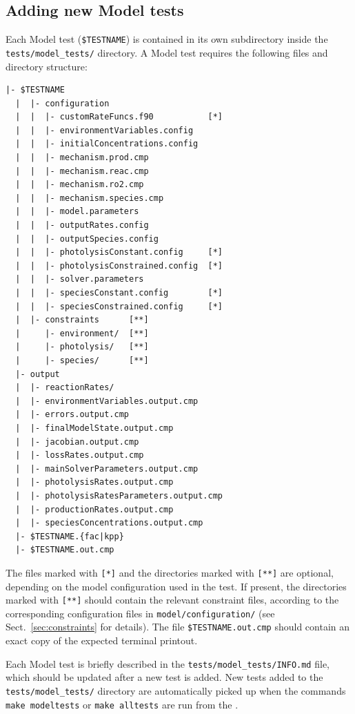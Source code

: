 \subsection{Adding new Model tests} \label{subsec:adding-new-model-tests}

Each Model test (\texttt{\$TESTNAME}) is contained in its own
subdirectory inside the \texttt{tests/model\_tests/} directory. A
Model test requires the following files and directory structure:

\begin{Verbatim}[fontsize=\small]
  |- $TESTNAME
  |  |- configuration
  |  |  |- customRateFuncs.f90           [*]
  |  |  |- environmentVariables.config
  |  |  |- initialConcentrations.config
  |  |  |- mechanism.prod.cmp
  |  |  |- mechanism.reac.cmp
  |  |  |- mechanism.ro2.cmp
  |  |  |- mechanism.species.cmp
  |  |  |- model.parameters
  |  |  |- outputRates.config
  |  |  |- outputSpecies.config
  |  |  |- photolysisConstant.config     [*]
  |  |  |- photolysisConstrained.config  [*]
  |  |  |- solver.parameters
  |  |  |- speciesConstant.config        [*]
  |  |  |- speciesConstrained.config     [*]
  |  |- constraints      [**]
  |     |- environment/  [**]
  |     |- photolysis/   [**]
  |     |- species/      [**]
  |- output
  |  |- reactionRates/
  |  |- environmentVariables.output.cmp
  |  |- errors.output.cmp
  |  |- finalModelState.output.cmp
  |  |- jacobian.output.cmp
  |  |- lossRates.output.cmp
  |  |- mainSolverParameters.output.cmp
  |  |- photolysisRates.output.cmp
  |  |- photolysisRatesParameters.output.cmp
  |  |- productionRates.output.cmp
  |  |- speciesConcentrations.output.cmp
  |- $TESTNAME.{fac|kpp}
  |- $TESTNAME.out.cmp
\end{Verbatim}

The files marked with \texttt{[*]} and the directories marked with
\texttt{[**]} are optional, depending on the model configuration used
in the test. If present, the directories marked with \texttt{[**]}
should contain the relevant constraint files, according to the
corresponding configuration files in \texttt{model/configuration/}
(see Sect.~\ref{sec:constraints} for details). The file
\texttt{\$TESTNAME.out.cmp} should contain an exact copy of the
expected terminal printout.

Each Model test is briefly described in the \texttt{tests/model\_tests/INFO.md}
file, which should be updated after a new test is added. New tests added
to the \texttt{tests/model\_tests/} directory are automatically picked up when
the commands \verb|make modeltests| or \verb|make alltests| are run from
the \maindir.

